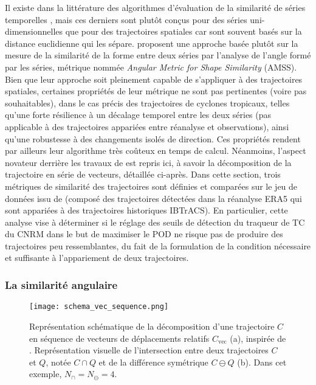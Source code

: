 \documentclass[../main.tex]{subfiles}
\begin{document}
Il existe dans la littérature des algorithmes d'évaluation de la similarité de séries temporelles
\parencite{faloutsos_fast_1994,das_finding_1997,frentzos_indexbased_2007}, mais ces derniers sont plutôt conçus pour des séries uni-dimensionnelles que pour des
trajectoires spatiales car sont souvent basés sur la distance euclidienne qui les sépare. \textcite{nakamura_shapebased_2013} proposent une approche basée
plutôt sur la mesure de la similarité de la forme entre deux séries par l'analyse de l'angle formé par les séries, métrique nommée \textit{Angular Metric for
Shape Similarity} (AMSS). Bien que leur approche soit pleinement capable de s'appliquer à des trajectoires spatiales, certaines propriétés de leur métrique
ne sont pas pertinentes (voire pas souhaitables), dans le cas précis des trajectoires de cyclones tropicaux, telles qu'une forte résilience à un décalage
temporel entre les deux séries (pas applicable à des trajectoires appariées entre réanalyse et observations), ainsi qu'une robustesse à des changements
isolés de direction. Ces propriétés rendent par ailleurs leur algorithme très coûteux en temps de calcul. Néanmoins, l'aspect novateur derrière les travaux
de \textcite{nakamura_shapebased_2013} est repris ici, à savoir la décomposition de la trajectoire en série de vecteurs, détaillée ci-après. Dans cette
section, trois métriques de similarité des trajectoires sont définies et comparées sur le jeu de données issu de \textcite{dulac_assessing_2023} (composé
des trajectoires détectées dans la réanalyse ERA5 qui sont appariées à des trajectoires historiques IBTrACS). En particulier, cette analyse vise à
déterminer si le réglage des seuils de détection du traqueur de TC du CNRM dans le but de maximiser le POD ne risque pas de produire des trajectoires peu
ressemblantes, du fait de la formulation de la condition nécessaire et suffisante à l'appariement de deux trajectoires.

\subsubsection*{La similarité angulaire}

\begin{figure}[htbp]
    \centering
    \texttt{[image: schema\_vec\_sequence.png]}
    \caption{Représentation schématique de la décomposition d'une trajectoire $C$ en séquence de vecteurs de déplacements relatifs $C_{\text{vec}}$ (a),
    inspirée de \textcite{nakamura_shapebased_2013}. Représentation visuelle de l'intersection entre deux trajectoires $C$ et $Q$, notée $C \cap Q$ et de la
    différence symétrique $C \ominus Q$ (b). Dans cet exemple, $N_\cap = N_\ominus = 4$.}
    \label{fig:schema_trajectoires}
\end{figure}
\end{document}
